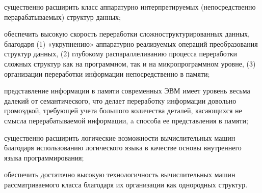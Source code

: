 \begin{SCn}
{	\begin{scnitemize}
		\item существенно расширить класс аппаратурно интерпретируемых (непосредственно перарабатываемых) структур данных;
		\item обеспечить высокую скорость переработки сложноструктурированных данных, благодаря (1) «укрупнению» аппаратурно реализуемых операций преобразования структур данных, (2) глубокому распараллеливанию процесса переработки сложных структур как на программном, так и на микропрограммном уровне, (3) организации переработки информации непосредственно в памяти;
		\item представление информации в памяти современных ЭВМ имеет уровень весьма далекий от семантического, что делает переработку информации довольно громоздкой, требующей учета большого количества деталей, касающихся не смысла перерабатываемой информации, a способа ее представления в памяти;
		\item существенно расширить логические возможности вычислительных машин благодаря использованию логического языка в качестве основы внутреннего языка программирования;
		\item обеспечить достаточно высокую технологичность вычислительных машин рассматриваемого класса благодаря их организации как однородных структур.
	\end{scnitemize}
}
\bigskip

\scnendstruct \scnendcurrentsectioncomment

\end{SCn}